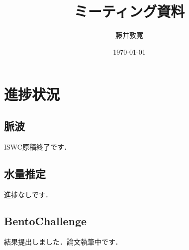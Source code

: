\documentclass[a4j,10pt]{jarticle}
\title{ミーティング資料}
\author{藤井敦寛}
\date{\today}
\begin{document}
\maketitle

\section{進捗状況}

\subsection{脈波}
ISWC原稿終了です．

\subsection{水量推定}
進捗なしです．

\subsection{BentoChallenge}
結果提出しました．論文執筆中です．





\end{document}
